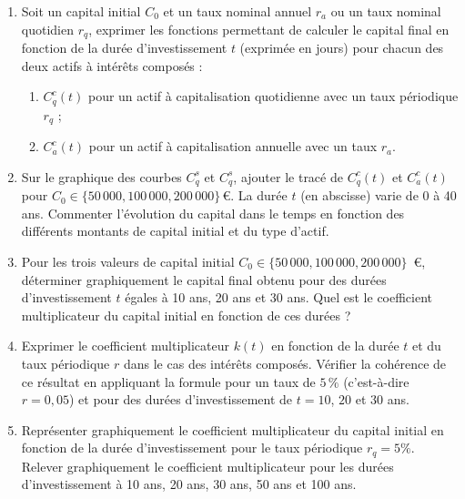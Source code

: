 \documentclass{article}
\begin{document}
\begin{enumerate}[label=\textbf{Q2.\arabic*}]
                \item Soit un capital initial \( C_0 \) et un taux nominal annuel \( r_a \) ou un taux nominal quotidien \( r_q \), exprimer les fonctions permettant de calculer le capital final en fonction de la durée d'investissement \( t \) (exprimée en jours) pour chacun des deux actifs à intérêts composés :
                \begin{enumerate}[label=(\alph*)]
                    \item \( C^c_q(t) \) pour un actif à capitalisation quotidienne avec un taux périodique \( r_q \) ;
                \item \( C^c_a(t) \) pour un actif à capitalisation annuelle avec un taux \( r_a \).
                \end{enumerate}

                \item Sur le graphique des courbes $C^s_q$ et $C^s_q$, ajouter le tracé de \( C^c_q(t) \) et \( C^c_a(t) \) pour \( C_0 \in \{50\,000, 100\,000, 200\,000\} \, \text{€} \). La durée \( t \) (en abscisse) varie de 0 à 40 ans. Commenter l'évolution du capital dans le temps en fonction des différents montants de capital initial et du type d'actif.

                \item Pour les trois valeurs de capital initial \( C_0 \in \{50\,000, 100\,000, 200\,000\} \)~€, déterminer graphiquement le capital final obtenu pour des durées d'investissement \( t \) égales à 10 ans, 20 ans et 30 ans. Quel est le coefficient multiplicateur du capital initial en fonction de ces durées ?

                \item Exprimer le coefficient multiplicateur \( k(t) \) en fonction de la durée \( t \) et du taux périodique \( r \) dans le cas des intérêts composés. Vérifier la cohérence de ce résultat en appliquant la formule pour un taux de \( 5\,\% \) (c'est-à-dire \( r=0,05 \)) et pour des durées d'investissement de \( t=10 \), \( 20 \) et \( 30 \) ans.

                \item Représenter graphiquement le coefficient multiplicateur du capital initial en fonction de la durée d’investissement pour le taux périodique $r_q = 5\%$. Relever graphiquement le coefficient multiplicateur pour les durées d’investissement à 10 ans, 20 ans, 30 ans, 50 ans et 100 ans.
            \end{enumerate}
\end{document}
